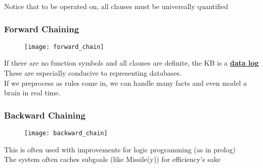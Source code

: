 \documentclass[../../lecture_notes.tex]{subfiles}
\begin{document}
\noindent Notice that to be operated on, all clauses must be universally quantified

\subsubsection*{Forward Chaining}
\begin{center}\begin{figure}[H]
	\texttt{[image: forward\_chain]}
\end{figure}\end{center}
\noindent If there are no function symbols and all clauses are definite, the KB is a \textbf{\underline{data log}}\\
\indent These are especially conducive to representing databases.\\
If we preprocess as rules come in, we can handle many facts and even model a brain in real time.\\

\subsubsection*{Backward Chaining}
\begin{center}\begin{figure}[H]
	\texttt{[image: backward\_chain]}
\end{figure}\end{center}
\noindent This is often used with improvements for logic programming (as in prolog)\\
The system often caches subgoals (like Missile(y)) for efficiency’s sake
\end{document}

